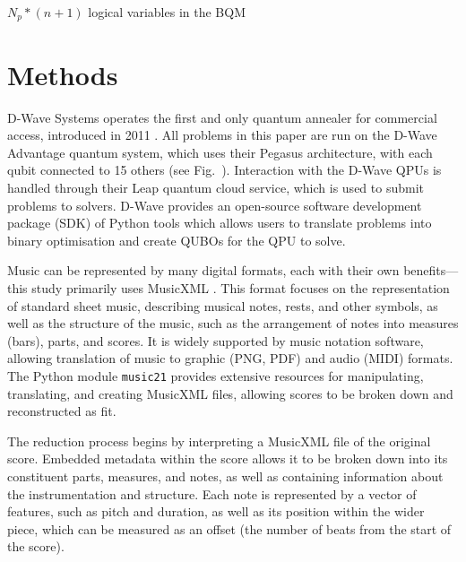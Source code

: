 \documentclass[12pt]{article}
\begin{document}
$N_p * (n+1)$ logical variables in the BQM


\section{Methods}

D-Wave Systems operates the first and only quantum annealer for commercial access, introduced in 2011 . All problems in this paper are run on the D-Wave Advantage quantum system, which uses their Pegasus architecture, with each qubit connected to 15 others (see Fig.\  ).
Interaction with the D-Wave QPUs is handled through their Leap quantum cloud service, which is used to submit problems to solvers. D-Wave provides an open-source software development package (SDK) of Python tools which allows users to translate problems into binary optimisation and create QUBOs for the QPU to solve.

Music can be represented by many digital formats, each with their own benefits—this study primarily uses MusicXML . This format focuses on the representation of standard sheet music, describing musical notes, rests, and other symbols, as well as the structure of the music, such as the arrangement of notes into measures (bars), parts, and scores. It is widely supported by music notation software, allowing translation of music to graphic (PNG, PDF) and audio (MIDI) formats. The Python module \verb|music21| provides extensive resources for manipulating, translating, and creating MusicXML files, allowing scores to be broken down and reconstructed as fit.

The reduction process begins by interpreting a MusicXML file of the original score. Embedded metadata within the score allows it to be broken down into its constituent parts, measures, and notes, as well as containing information about the instrumentation and structure. Each note is represented by a vector of features, such as pitch and duration, as well as its position within the wider piece, which can be measured as an offset (the number of beats from the start of the score).
\end{document}
